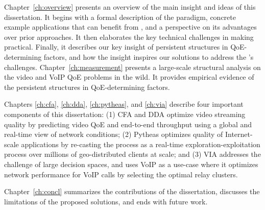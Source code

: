 Chapter~\ref{ch:overview} presents an overview of the main insight and 
ideas of this dissertation.
It begins with a formal description of the \ddn paradigm,
concrete example applications that can benefit from \ddn, and a
perspective on its advantages over prior approaches.
It then elaborates the key technical challenges in making \ddn practical. 
Finally, it describes our key insight of persistent structures in 
QoE-determining factors, and how the insight inspires our solutions to 
address the \ddn's challenges.
Chapter~\ref{ch:measurement} presents a large-scale structural analysis
on the video and VoIP QoE problems in the wild.
It provides empirical evidence of the persistent structures in QoE-determining
factors. 

Chapters \ref{ch:cfa}, \ref{ch:dda}, \ref{ch:pytheas}, and \ref{ch:via} 
describe four important components of this dissertation: 
(1) CFA and DDA optimize video streaming quality by predicting 
video QoE and end-to-end throughput using a global and real-time view of 
network conditions;
(2) Pytheas optimizes quality of Internet-scale applications by re-casting
the \ddn process as a real-time exploration-exploitation process 
over millions of geo-distributed clients at scale; and
(3) VIA addresses the challenge of large decision spaces, and uses 
VoIP as a use-case where it optimizes network performance for VoIP calls 
by selecting the optimal relay clusters.

Chapter~\ref{ch:concl} summarizes the contributions of the dissertation, 
discusses the limitations of the proposed solutions, and ends with future 
work.










